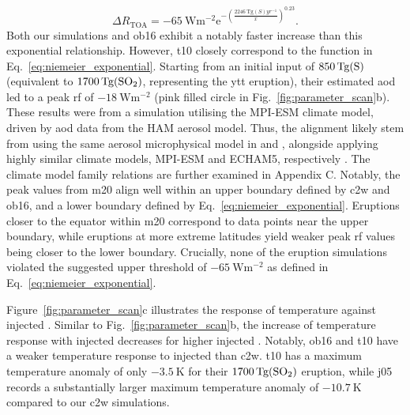\documentclass{ametsocV6.1}
\newcommand{\iso}[1][i]{{#1}njected \ce{SO2}}
\begin{document}
\begin{equation}
  \Delta
  R_{\mathrm{TOA}} =
  -\SI{65}{\watt\metre^{-2}}
  \mathrm{e}^{-{\left(\frac{\SI{2246}{\tera\gram(S)yr^{-1}}}{x}\right)}^{0.23}}.
  \label{eq:niemeier_exponential}
\end{equation}
%
Both our simulations and \gls{ob16} exhibit a notably faster increase than this
exponential relationship. However, \gls{t10} closely correspond to the function in
Eq.~\ref{eq:niemeier_exponential}. Starting from an initial input of
\(\SI{850}{\tera\gram(\ce{S})}\) (equivalent to \(\SI{1700}{\tera\gram(\ce{SO2})}\),
representing the \gls{ytt} eruption), their estimated \gls{aod} led to a peak \gls{rf}
of \(\SI{-18}{\watt\metre^{-2}}\) (pink filled circle in
Fig.~\ref{fig:parameter_scan}b). These results were from a simulation utilising the
MPI-ESM climate model, driven by \gls{aod} data from the HAM aerosol model. Thus, the
alignment likely stem from using the same aerosol microphysical model in
\citet{timmreck2010} and \citet{niemeier2015}, alongside applying highly similar climate
models, MPI-ESM and ECHAM5, respectively \citep{kuma2023}. The climate model family
relations are further examined in Appendix C. Notably, the peak values from \gls{m20}
align well within an upper boundary defined by \gls{c2w} and \gls{ob16}, and a lower
boundary defined by Eq.~\ref{eq:niemeier_exponential}. Eruptions closer to the equator
within \gls{m20} correspond to data points near the upper boundary, while eruptions at
more extreme latitudes yield weaker peak \gls{rf} values being closer to the lower
boundary. Crucially, none of the eruption simulations violated the suggested upper
threshold of \(\SI{-65}{\watt\metre^{-2}}\) as defined in
Eq.~\ref{eq:niemeier_exponential}.

Figure~\ref{fig:parameter_scan}c illustrates the response of temperature against \iso{}.
Similar to Fig.~\ref{fig:parameter_scan}b, the increase of temperature response with
\iso{} decreases for higher \iso{}. Notably, \gls{ob16} and \gls{t10} have a weaker
temperature response to \iso{} than \gls{c2w}.
\gls{t10} has a maximum temperature anomaly of only \(\SI{-3.5}{\kelvin}\) for their
\(\SI{1700}{\tera\gram(\ce{SO2})}\) eruption, while \gls{j05} records a substantially
larger maximum temperature anomaly of \(\SI{-10.7}{\kelvin}\) compared to our \gls{c2w}
simulations.
\end{document}
